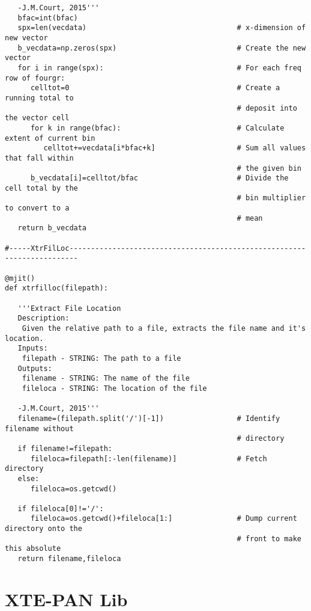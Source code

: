 \begin{verbatim}
   -J.M.Court, 2015'''
   bfac=int(bfac)
   spx=len(vecdata)                                   # x-dimension of new vector
   b_vecdata=np.zeros(spx)                            # Create the new vector
   for i in range(spx):                               # For each freq row of fourgr:
      celltot=0                                       # Create a running total to
                                                      # deposit into the vector cell
      for k in range(bfac):                           # Calculate extent of current bin
         celltot+=vecdata[i*bfac+k]                   # Sum all values that fall within
                                                      # the given bin
      b_vecdata[i]=celltot/bfac                       # Divide the cell total by the
                                                      # bin multiplier to convert to a
                                                      # mean
   return b_vecdata

#-----XtrFilLoc------------------------------------------------------------------------

@mjit()
def xtrfilloc(filepath):

   '''Extract File Location
   Description:
    Given the relative path to a file, extracts the file name and it's location.
   Inputs:
    filepath - STRING: The path to a file
   Outputs:
    filename - STRING: The name of the file
    fileloca - STRING: The location of the file

   -J.M.Court, 2015'''
   filename=(filepath.split('/')[-1])                 # Identify filename without
                                                      # directory
   if filename!=filepath:
      fileloca=filepath[:-len(filename)]              # Fetch directory
   else:
      fileloca=os.getcwd()

   if fileloca[0]!='/':
      fileloca=os.getcwd()+fileloca[1:]               # Dump current directory onto the
                                                      # front to make this absolute
   return filename,fileloca
\end{verbatim}

\section{XTE-PAN Lib}

